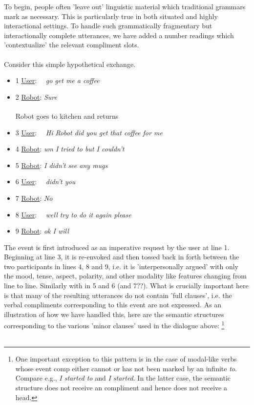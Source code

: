 To begin, people often 'leave out' linguistic material which traditional grammars mark as necessary. This is particularly true in both situated and highly interactional settings. To handle such grammatically fragmentary but interactionally complete utterances, we have added a number readings which 'contextualize' the relevant compliment slots. \\ \\
Consider this simple hypothetical exchange. 
\begin{itemize}
\item 1 \ul{User}:  \ \ \emph{go get me a coffee}
\item 2 \ul{Robot}: \emph{Sure} \\  \\ Robot goes to kitchen and returns 
\item 3  \ul{User}: \ \ \emph{Hi Robot did you get that coffee for me} 
\item 4  \ul{Robot}: \emph{um I tried to but I couldn't} 
\item 5  \ul{Robot}: \emph{I didn't see any mugs}
\item 6  \ul{User}:  \ \ \emph{didn't you}  
\item 7  \ul{Robot}: \emph{No} 
\item 8  \ul{User}: \ \ \emph{well try to do it again please} 
\item 9  \ul{Robot}: \emph{ok I will} 
\end{itemize}
The event  is first introduced as an imperative request by the user at line 1. Beginning at line 3, it is re-envoked and then tossed back in forth between the two participants in lines 4, 8 and 9, i.e. it is 'interpersonally argued' with only the mood, tense, aspect, polarity, and other modality like features changing from line to line. Similarly with  in 5 and 6 (and 7??). What is crucially important here is that many of the resulting utterances do not contain 'full clauses', i.e. the  verbal compliments corresponding to this event are not expressed. As an illustration of how we have handled this, here are the semantic structures corresponding to the various 'minor clauses' used in the dialogue above: \footnote{One important exception to this pattern is in the case of modal-like verbs whose event comp  either cannot or has not been marked by an infinite \emph{to}. Compare e.g., \emph{I started to} and \emph{I started}. In the latter case, the semantic structure does not receive an  compliment and hence does not receive a  head.  }  \\ \\
